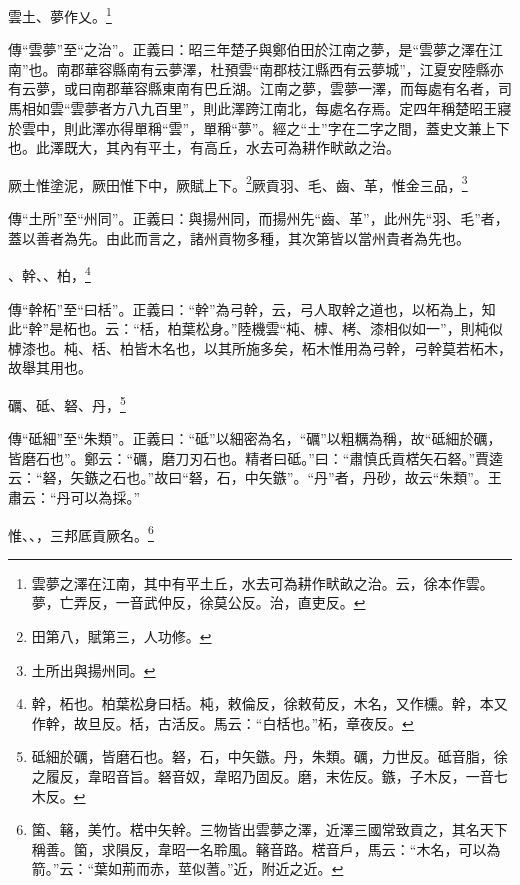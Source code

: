 雲土、夢作乂。\footnote{雲夢之澤在江南，其中有平土丘，水去可為耕作畎畝之治。云，徐本作雲。夢，亡弄反，一音武仲反，徐莫公反。治，直吏反。}

{\noindent\zhuan{}\fzbyks 傳“雲夢”至“之治”。正義曰：昭三年楚子與鄭伯田於江南之夢，是“雲夢之澤在江南”也。南郡華容縣南有云夢澤，杜預雲“南郡枝江縣西有云夢城”，江夏安陸縣亦有云夢，或曰南郡華容縣東南有巴丘湖。江南之夢，雲夢一澤，而每處有名者，司馬相如雲“雲夢者方八九百里”，則此澤跨江南北，每處名存焉。定四年稱楚昭王寢於雲中，則此澤亦得單稱“雲”，單稱“夢”。經之“土”字在二字之間，蓋史文兼上下也。此澤既大，其內有平土，有高丘，水去可為耕作畎畝之治。 \par}

厥土惟塗泥，厥田惟下中，厥賦上下。\footnote{田第八，賦第三，人功修。}厥貢羽、毛、齒、革，惟金三品，\footnote{土所出與揚州同。}

{\noindent\zhuan{}\fzbyks 傳“土所”至“州同”。正義曰：與揚州同，而揚州先“齒、革”，此州先“羽、毛”者，蓋以善者為先。由此而言之，諸州貢物多種，其次第皆以當州貴者為先也。 \par}

、幹、、柏，\footnote{幹，柘也。柏葉松身曰栝。杶，敕倫反，徐敕荀反，木名，又作櫄。幹，本又作幹，故旦反。栝，古活反。馬云：“白栝也。”柘，章夜反。}

{\noindent\zhuan{}\fzbyks 傳“幹柘”至“曰栝”。正義曰：“幹”為弓幹，云，弓人取幹之道也，以柘為上，知此“幹”是柘也。云：“栝，柏葉松身。”陸機雲“杶、㯉、栲、漆相似如一”，則杶似㯉漆也。杶、栝、柏皆木名也，以其所施多矣，柘木惟用為弓幹，弓幹莫若柘木，故舉其用也。 \par}

礪、砥、砮、丹，\footnote{砥細於礪，皆磨石也。砮，石，中矢鏃。丹，朱類。礪，力世反。砥音脂，徐之履反，韋昭音旨。砮音奴，韋昭乃固反。磨，末佐反。鏃，子木反，一音七木反。}

{\noindent\zhuan{}\fzbyks 傳“砥細”至“朱類”。正義曰：“砥”以細密為名，“礪”以粗糲為稱，故“砥細於礪，皆磨石也”。鄭云：“礪，磨刀刃石也。精者曰砥。”曰：“肅慎氏貢楛矢石砮。”賈逵云：“砮，矢鏃之石也。”故曰“砮，石，中矢鏃”。“丹”者，丹砂，故云“朱類”。王肅云：“丹可以為採。” \par}

惟、、，三邦厎貢厥名。\footnote{箘、簵，美竹。楛中矢幹。三物皆出雲夢之澤，近澤三國常致貢之，其名天下稱善。箘，求隕反，韋昭一名聆風。簵音路。楛音戶，馬云：“木名，可以為箭。”云：“葉如荊而赤，莖似蓍。”近，附近之近。}

